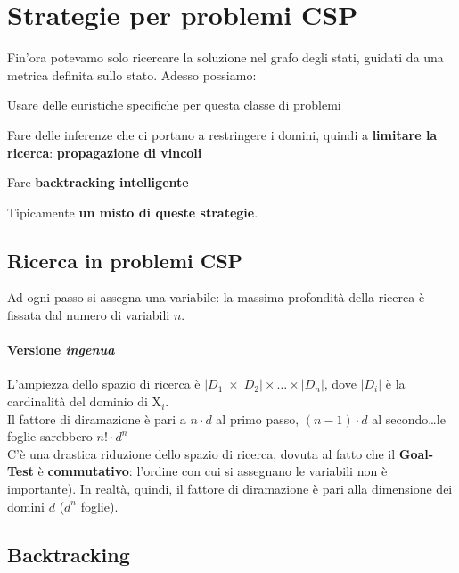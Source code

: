 \documentclass[10pt]{book}
\begin{document}
\section{Strategie per problemi CSP}
Fin'ora potevamo solo ricercare la soluzione nel grafo degli stati, guidati da una metrica definita sullo stato. Adesso possiamo:
\begin{list}{}{}
	\item Usare delle euristiche specifiche per questa classe di problemi
	\item Fare delle inferenze che ci portano a restringere i domini, quindi a \textbf{limitare la ricerca}: \textbf{propagazione di vincoli}
	\item Fare \textbf{backtracking intelligente}
\end{list}
Tipicamente \textbf{un misto di queste strategie}.
\pagebreak
\subsection{Ricerca in problemi CSP}
Ad ogni passo si assegna una variabile: la massima profondità della ricerca è fissata dal numero di variabili $n$.
\paragraph{Versione \textit{ingenua}} L'ampiezza dello spazio di ricerca è $|D_1| \times |D_2| \times \ldots \times |D_n|$, dove $|D_i|$ è la cardinalità del dominio di X$_i$.\\
Il fattore di diramazione è pari a $n\cdot d$ al primo passo, $(n-1)\cdot d$ al secondo\ldots le foglie sarebbero $n!\cdot d^n$\\
C'è una drastica riduzione dello spazio di ricerca, dovuta al fatto che il \textbf{Goal-Test} è \textbf{commutativo}: l'ordine con cui si assegnano le variabili non è importante). In realtà, quindi, il fattore di diramazione è pari alla dimensione dei domini $d$ ($d^n$ foglie).
\subsection{Backtracking}
\end{document}
